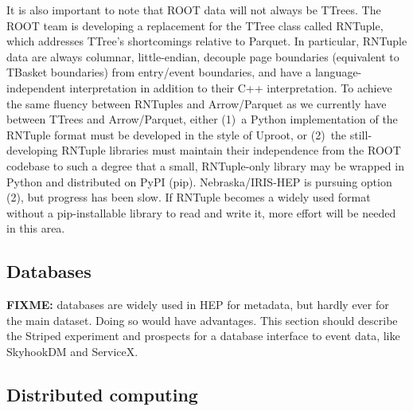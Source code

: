 \documentclass{article}
\begin{document}
It is also important to note that ROOT data will not always be TTrees. The ROOT team is developing a replacement for the TTree class called RNTuple, which addresses TTree's shortcomings relative to Parquet. In particular, RNTuple data are always columnar, little-endian, decouple page boundaries (equivalent to TBasket boundaries) from entry/event boundaries, and have a language-independent interpretation in addition to their C++ interpretation. To achieve the same fluency between RNTuples and Arrow/Parquet as we currently have between TTrees and Arrow/Parquet, either (1)~a Python implementation of the RNTuple format must be developed in the style of Uproot, or (2)~the still-developing RNTuple libraries must maintain their independence from the ROOT codebase to such a degree that a small, RNTuple-only library may be wrapped in Python and distributed on PyPI (pip). Nebraska/IRIS-HEP is pursuing option (2), but progress has been slow. If RNTuple becomes a widely used format without a pip-installable library to read and write it, more effort will be needed in this area.

\subsection{Databases}

{\bf FIXME:} databases are widely used in HEP for metadata, but hardly ever for the main dataset. Doing so would have advantages. This section should describe the Striped experiment and prospects for a database interface to event data, like SkyhookDM and ServiceX.

\subsection{Distributed computing}
\end{document}
